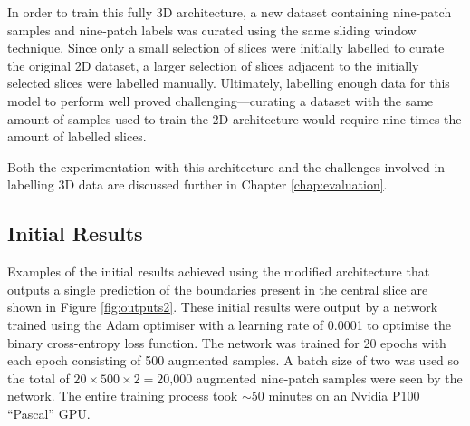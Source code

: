 In order to train this fully 3D architecture, a new dataset containing nine-patch samples and nine-patch labels was curated using the same sliding window technique. Since only a small selection of slices were initially labelled to curate the original 2D dataset, a larger selection of slices adjacent to the initially selected slices were labelled manually. Ultimately, labelling enough data for this model to perform well proved challenging---curating a dataset with the same amount of samples used to train the 2D architecture would require nine times the amount of labelled slices.

Both the experimentation with this architecture and the challenges involved in labelling 3D data are discussed further in Chapter \ref{chap:evaluation}.

\subsection{Initial Results}

Examples of the initial results achieved using the modified architecture that outputs a single prediction of the boundaries present in the central slice are shown in Figure \ref{fig:outputs2}. These initial results were output by a network trained using the Adam optimiser with a learning rate of 0.0001 to optimise the binary cross-entropy loss function. The network was trained for 20 epochs with each epoch consisting of 500 augmented samples. A batch size of two was used so the total of $20\times500\times2=\text{20,000}$ augmented nine-patch samples were seen by the network. The entire training process took ${\sim}$50 minutes on an Nvidia P100 ``Pascal'' GPU.

